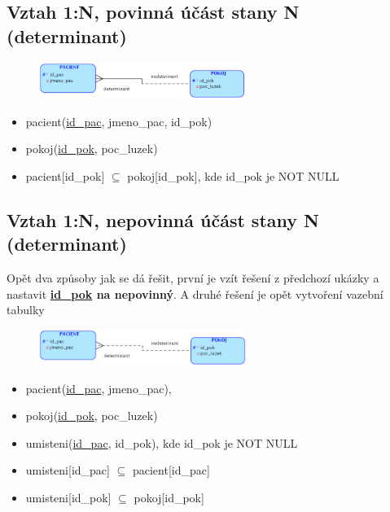 \documentclass{szzclass}
\begin{document}
\subsection{Vztah 1:N, povinná účást stany N (determinant)}
\begin{figure}[h!]
    \centering
    \includegraphics[width=0.6\textwidth]{topics/bi-wsi-si-02/images/oneToN.png}
\end{figure}
\begin{itemize}
    \item pacient(\underline{id\_pac}, jmeno\_pac, id\_pok)
    \item pokoj(\underline{id\_pok}, poc\_luzek)
    \item pacient[id\_pok] $\subseteq$ pokoj[id\_pok], kde id\_pok je NOT NULL
\end{itemize}


\subsection{Vztah 1:N, nepovinná účást stany N (determinant)}
Opět dva způsoby jak se dá řešit, první je vzít řešení z předchozí ukázky a nastavit \textbf{\underline{id\_pok} na nepovinný}. A druhé řešení
je opět vytvoření vazební tabulky
\begin{figure}[h!]
    \centering
    \includegraphics[width=0.6\textwidth]{topics/bi-wsi-si-02/images/oneToNV2.png}
\end{figure}
\begin{itemize}
    \item pacient(\underline{id\_pac}, jmeno\_pac),
    \item pokoj(\underline{id\_pok}, poc\_luzek)
    \item umisteni(\underline{id\_pac}, id\_pok), kde id\_pok je NOT NULL
    \item umisteni[id\_pac] $\subseteq$ pacient[id\_pac] 
    \item umisteni[id\_pok] $\subseteq$ pokoj[id\_pok]
\end{itemize}
\end{document}
